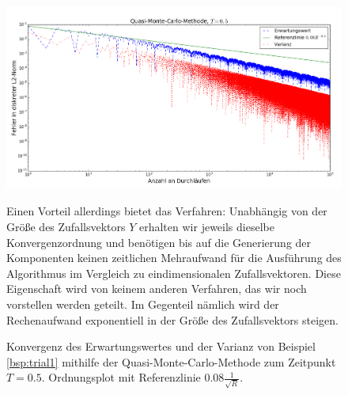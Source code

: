 \begin{figure}
\includegraphics[width=\textwidth]{Figures/quasi_mc_convergence_trial1.png}
\caption{Konvergenz des Erwartungswertes und der Varianz von Beispiel \ref{bsp:trial1} mithilfe der Quasi-Monte-Carlo-Methode zum Zeitpunkt $T=0.5$. Ordnungsplot mit Referenzlinie $0.08\frac{1}{\sqrt{R}}$.}
Einen Vorteil allerdings bietet das Verfahren: Unabhängig von der Größe des Zufallsvektors $Y$ erhalten wir jeweils dieselbe Konvergenzordnung und benötigen bis auf die Generierung der Komponenten keinen zeitlichen Mehraufwand für die Ausführung des Algorithmus im Vergleich zu eindimensionalen Zufallsvektoren. Diese Eigenschaft wird von keinem anderen Verfahren, das wir noch vorstellen werden geteilt. Im Gegenteil nämlich wird der Rechenaufwand exponentiell in der Größe des Zufallsvektors steigen. 
\label{fig:quasi_mc_convergence_trial1}
\end{figure}

